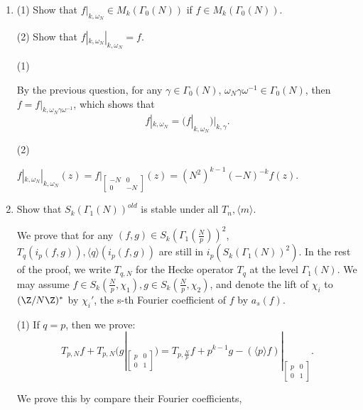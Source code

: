 \begin{enumerate}
\item 

(1) Show that $f|_{k, \omega_N}\in M_k(\Gamma_0(N))$ if $f\in M_k(\Gamma_0(N))$.

(2) Show that $f|_{k, \omega_N} |_{k, \omega_N} = f$.


\begin{proofc}[解答]
(1)

By the previous question, for any $\gamma \in \Gamma_0(N)$, $\omega_N \gamma \omega^{-1} \in \Gamma_0(N)$, 
then $f = f |_{k, \omega_N \gamma \omega^{-1}}$, which shows that 
$$f|_{k, \omega_N} = (f|_{k, \omega_N})|_{k, \gamma}.$$


(2)

$f|_{k, \omega_N} |_{k, \omega_N}(z) = f|_{\begin{bmatrix}
    -N & 0 \\
    0 & -N
\end{bmatrix}}(z) = (N^2)^{k-1} (-N)^{-k}f(z).$


\end{proofc}











\item
Show that $S_k(\Gamma_1(N))^{old}$ is stable under all $T_n, \langle m \rangle$.



We prove that for any $(f,g) \in S_k(\Gamma_1(\frac{N}{p}))^2$, $T_q(i_p(f,g)), \langle q \rangle(i_p(f,g))$ are still in $i_p(S_k(\Gamma_1(N))^2)$.
In the rest of the proof, we write $T_{q, N}$ for the Hecke operator $T_q$ at the level $\Gamma_1(N)$.
We may assume $f\in S_k(\frac{N}{p}, \chi_1), g \in S_k(\frac{N}{p}, \chi_2)$, and denote the lift of $\chi_i$ to $(\Z/N\Z)^*$ by $\chi_i'$, the s-th Fourier coefficient of $f$ by $a_s(f)$.



(1) If $q = p$, then we prove:
$$T_{p, N}f + T_{p, N}(g|_{\begin{bmatrix}
    p  & 0\\
    0 & 1
\end{bmatrix}}) = T_{p, \frac{N}{p}}f + p^{k-1}g - (\langle p \rangle f)|_{\begin{bmatrix}
    p & 0 \\
    0 & 1
\end{bmatrix}}.$$

We prove this by compare their Fourier coefficients, 


\end{enumerate}
